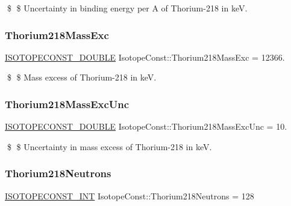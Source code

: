 \$ \$ Uncertainty in binding energy per A of Thorium-\/218 in keV. \mbox{\label{group___isotope_const-_thorium-_th218_ga3bbb7e2c4d6d2ba82b75bd7073afa268}} 
\subsubsection{\texorpdfstring{Thorium218\+Mass\+Exc}{Thorium218MassExc}}
{\footnotesize\ttfamily \mbox{\hyperlink{group___isotope_const-_macros_ga8f45a7272ce02c0b4c65c44636ed719a}{I\+S\+O\+T\+O\+P\+E\+C\+O\+N\+S\+T\+\_\+\+D\+O\+U\+B\+LE}} Isotope\+Const\+::\+Thorium218\+Mass\+Exc = 12366.}

\$ \$ Mass excess of Thorium-\/218 in keV. \mbox{\label{group___isotope_const-_thorium-_th218_ga0ce24c9a8fd54614861563166bd32e69}} 
\subsubsection{\texorpdfstring{Thorium218\+Mass\+Exc\+Unc}{Thorium218MassExcUnc}}
{\footnotesize\ttfamily \mbox{\hyperlink{group___isotope_const-_macros_ga8f45a7272ce02c0b4c65c44636ed719a}{I\+S\+O\+T\+O\+P\+E\+C\+O\+N\+S\+T\+\_\+\+D\+O\+U\+B\+LE}} Isotope\+Const\+::\+Thorium218\+Mass\+Exc\+Unc = 10.}

\$ \$ Uncertainty in mass excess of Thorium-\/218 in keV. \mbox{\label{group___isotope_const-_thorium-_th218_ga437e04777fc24cfa75811abbea101260}} 
\subsubsection{\texorpdfstring{Thorium218\+Neutrons}{Thorium218Neutrons}}
{\footnotesize\ttfamily \mbox{\hyperlink{group___isotope_const-_macros_ga5f18360b3e99483a35c32d789e62621c}{I\+S\+O\+T\+O\+P\+E\+C\+O\+N\+S\+T\+\_\+\+I\+NT}} Isotope\+Const\+::\+Thorium218\+Neutrons = 128}

